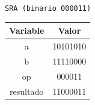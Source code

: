 \documentclass[letterpaper]{sae}
\begin{document}
\begin{figure}[H] %
\label{fig:test6}
\end{figure}

\verb+SRA (binario 000011)+\\

\begin{center}
	\begin{tabular}{|c|c|}
		\hline 
		Variable & Valor\tabularnewline
		\hline 
		\hline 
		a & 10101010\tabularnewline
		\hline 
		b & 11110000\tabularnewline
		\hline 
		op & 000011\tabularnewline
		\hline 
		resultado & 11000011\tabularnewline
		\hline 
	\end{tabular}
\end{center}
\end{document}
